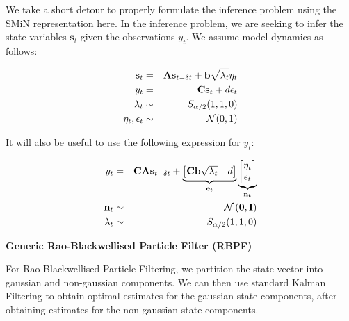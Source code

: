 \documentclass[../main.tex]{subfiles}
\begin{document}
We take a short detour to properly formulate the inference problem using the SMiN representation here. In the inference problem, we are seeking to infer the state variables $\mathbf{s}_t$ given the observations $y_t$. We assume model dynamics as follows:

\begin{eqnarray}
    \mathbf{s}_{t} & = & \mathbf{A} \mathbf{s}_{t - \delta t} + \mathbf{b}\sqrt{\lambda_t} \eta_t \notag \\
    y_t  & = & \mathbf{C} \mathbf{s}_t + d \epsilon_t \\
    \lambda_t & \sim & S_{\alpha / 2}(1,1,0) \notag \\
    \eta_t, \epsilon_t & \sim & \mathcal{N}(0,1) \notag 
\end{eqnarray}

It will also be useful to use the following expression for $y_t$:

\begin{eqnarray}
    y_t & = & \mathbf{CA} \mathbf{s}_{t - \delta t} + \underbrace{
        \begin{bmatrix}
            \mathbf{Cb} \sqrt{\lambda_t} & d
        \end{bmatrix}
    }_{\mathbf{e}_t} \underbrace{
        \begin{bmatrix}
        \eta_t \\ \epsilon_t
        \end{bmatrix}
    }_{\mathbf{n_t}} \\
    \mathbf{n}_t & \sim & \mathcal{N} \left(
        \mathbf{0}
        , \mathbf{I} \right) \notag \\
    \lambda_t & \sim & S_{\alpha / 2}(1,1,0) \notag
\end{eqnarray}


\textbf{Generic Rao-Blackwellised Particle Filter (RBPF)}

For Rao-Blackwellised Particle Filtering, we partition the state vector into gaussian and non-gaussian components. We can then use standard Kalman Filtering to obtain optimal estimates for the gaussian state components, after obtaining estimates for the non-gaussian state components.  
\end{document}
